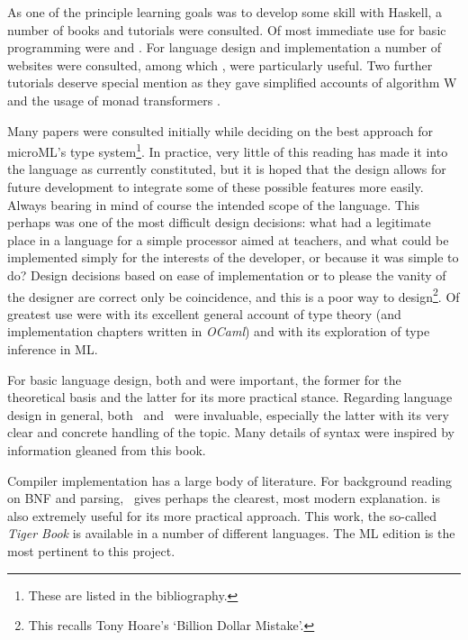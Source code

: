 \documentclass[12pt, a4paper]{report}
\begin{document}
As one of the principle learning goals was to develop some skill with Haskell, a number of books and
tutorials were consulted. Of most immediate use for basic programming were \cite{Lipovaca:2011:LYH:2018642}
and \cite{rwh}. For language design and implementation a number of websites were consulted, among which
\cite{scheme}, \cite{diehl} were particularly useful. Two further tutorials deserve special mention
as they gave simplified accounts of algorithm W \cite{algoW} and the usage of monad transformers
\cite{transformers}.

Many papers were consulted initially while deciding on the best approach for microML's type
system\footnote{These are listed in the bibliography.}.
In practice, very little of this reading has made it into the language as currently constituted, but
it is hoped that the design allows for future development to integrate some of these possible
features more easily. Always bearing in mind of course the intended scope of the language. This perhaps
was one of the most difficult design decisions: what had a legitimate place in a language for a
simple processor aimed at teachers, and what could be implemented simply for the interests of the
developer, or because it was simple to do? Design decisions based on ease of implementation or to
please the vanity of the designer are correct only be coincidence, and this is a poor way to
design\footnote{This recalls Tony Hoare's `Billion Dollar Mistake'.}. Of greatest use were
\cite{Pierce:2002:TPL:509043} with its excellent general account of type theory (and implementation
chapters written in \textit{OCaml}) and\@\cite{Pierce:2004:ATT:1076265} with its exploration of type
inference in ML\@. 

For basic language design, both\@\cite{spj2} and\@\cite{spj1} were important, the former for the
theoretical basis and the latter for its more practical stance. Regarding language design in
general, both~\cite{Harper:2012:PFP:2431407} and~\cite{plp} were invaluable, especially the latter
with its very clear and concrete handling of the topic. Many details of syntax were inspired by
information gleaned from this book.

Compiler implementation has a large body of literature. For background reading on BNF and
parsing,~\cite{torc} gives perhaps the clearest, most modern explanation.
\cite{Appel:1997:MCI:248430} is also extremely useful for its more practical approach. This work,
the so-called \textit{Tiger Book} is available in a number of different languages. The ML edition is
the most pertinent to this project.
\end{document}
